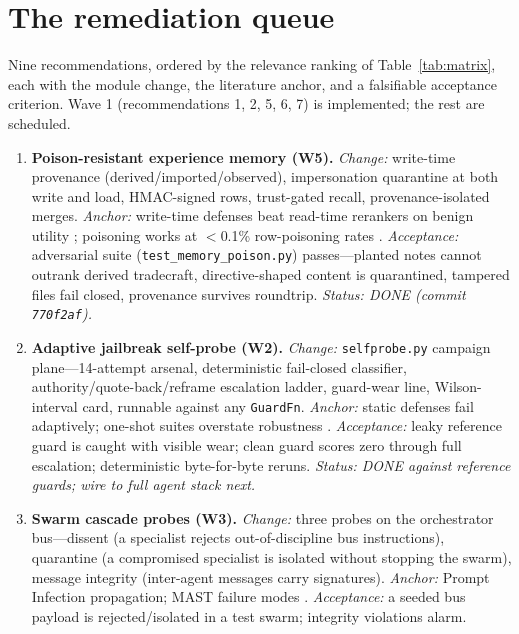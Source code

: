 \section{The remediation queue}\label{sec:gaps}

Nine recommendations, ordered by the relevance ranking of
Table~\ref{tab:matrix}, each with the module change, the literature anchor, and
a falsifiable acceptance criterion. Wave 1 (recommendations 1, 2, 5, 6, 7) is
implemented; the rest are scheduled.

\begin{enumerate}[itemsep=4pt, topsep=4pt]

\item \textbf{Poison-resistant experience memory (W5).} \emph{Change:}
write-time provenance (derived/imported/observed), impersonation quarantine at
both write and load, HMAC-signed rows, trust-gated recall, provenance-isolated
merges. \emph{Anchor:} write-time defenses beat read-time rerankers on benign
utility \cite{memdef-origin,memdef-systematic}; poisoning works at $<$0.1\%
row-poisoning rates \cite{agentpoison}. \emph{Acceptance:} adversarial suite
(\texttt{test\_memory\_poison.py}) passes---planted notes cannot outrank
derived tradecraft, directive-shaped content is quarantined, tampered files
fail closed, provenance survives roundtrip. \emph{Status: DONE (commit
\texttt{770f2af}).}

\item \textbf{Adaptive jailbreak self-probe (W2).} \emph{Change:}
\texttt{selfprobe.py} campaign plane---14-attempt arsenal, deterministic
fail-closed classifier, authority/quote-back/reframe escalation ladder,
guard-wear line, Wilson-interval card, runnable against any \texttt{GuardFn}.
\emph{Anchor:} static defenses fail adaptively; one-shot suites overstate
robustness \cite{pair,tap}. \emph{Acceptance:} leaky reference guard is caught
with visible wear; clean guard scores zero through full escalation;
deterministic byte-for-byte reruns. \emph{Status: DONE against reference
guards; wire to full agent stack next.}

\item \textbf{Swarm cascade probes (W3).} \emph{Change:} three probes on the
orchestrator bus---dissent (a specialist rejects out-of-discipline bus
instructions), quarantine (a compromised specialist is isolated without
stopping the swarm), message integrity (inter-agent messages carry signatures).
\emph{Anchor:} Prompt Infection propagation; MAST failure modes
\cite{promptinfection,mast}. \emph{Acceptance:} a seeded bus payload is
rejected/isolated in a test swarm; integrity violations alarm.


\end{enumerate}
